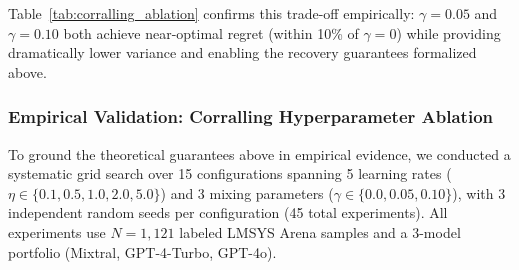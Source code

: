 Table~\ref{tab:corralling_ablation} confirms this trade-off empirically:
$\gamma = 0.05$ and $\gamma = 0.10$ both achieve near-optimal regret (within
10\% of $\gamma = 0$) while providing dramatically lower variance and enabling
the recovery guarantees formalized above.

\subsubsection{Empirical Validation: Corralling Hyperparameter Ablation}
\label{sec:appendix_corralling_ablation}

To ground the theoretical guarantees above in empirical evidence, we conducted a
systematic grid search over 15 configurations spanning 5 learning rates
($\eta \in \{0.1, 0.5, 1.0, 2.0, 5.0\}$) and 3 mixing parameters
($\gamma \in \{0.0, 0.05, 0.10\}$), with 3 independent random seeds per
configuration (45 total experiments).  All experiments use $N=1{,}121$ labeled
LMSYS Arena samples and a 3-model portfolio (Mixtral, GPT-4-Turbo, GPT-4o).

